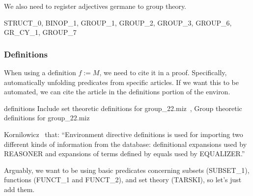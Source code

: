 We also need to register adjectives germane to group theory.

\nwenddocs{}\endmoddef\nwstartdeflinemarkup{}\nwenddeflinemarkup
STRUCT_0, BINOP_1, GROUP_1, GROUP_2, GROUP_3, GROUP_6, GR_CY_1, GROUP_7
\nwendcode{}\nwdocspar

\subsubsection{Definitions} When using a definition $f := M$, we need to cite it in
a proof. Specifically, automatically unfolding predicates from specific
articles. If we want this to be automated, we can cite the article in
the {\Tt{}definitions\nwendquote} portion of the {\Tt{}environ\nwendquote}.

\nwenddocs{}\endmoddef\nwstartdeflinemarkup{}\nwenddeflinemarkup
definitions \LA{}Include set theoretic definitions for \code{}group{\_}22.miz\edoc{}~{\nwtagstyle{}}\RA{},
  \LA{}Group theoretic definitions for \code{}group{\_}22.miz\edoc{}~{\nwtagstyle{}}\RA{}
\nwendcode{}\nwdocspar

\begin{remark}
  Kornilowicz~\cite[see \S{5.1}]{kornilowicz2015definitional} that:
  ``Environment directive {\Tt{}definitions\nwendquote} is used for importing two different kinds of information from the database: definitional expansions used by REASONER and expansions of terms defined by equals used by EQUALIZER.''
\end{remark}

Arguably, we want to be using basic predicates concerning subsets
({\Tt{}SUBSET{\_}1\nwendquote}), functions ({\Tt{}FUNCT{\_}1\nwendquote} and {\Tt{}FUNCT{\_}2\nwendquote}), and set theory
({\Tt{}TARSKI\nwendquote}), so let's just add them.

